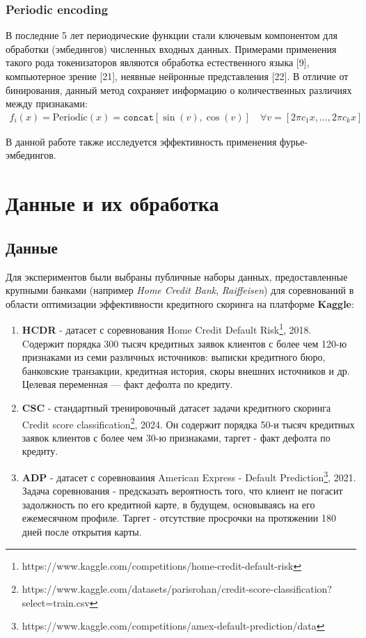 \documentclass[12pt]{article}
\begin{document}
\subsubsection{Periodic encoding}

В последние 5 лет периодические функции стали ключевым компонентом для обработки (эмбедингов) численных входных данных. Примерами применения такого рода токенизаторов являются обработка естественного языка [9], компьютерное зрение [21], неявные нейронные представления [22]. В отличие от бинирования, данный метод сохраняет информацию о количественных различиях между признаками:
\begin{align}
f_i(x) = \text{Periodic}(x) = \texttt{concat}[\sin(v), \cos(v)] \quad \forall v = [2\pi c_1 x, \ldots, 2\pi c_k x]
\end{align}

\noindent В данной работе также исследуется эффективность применения фурье-эмбедингов.

\newpage
\section{Данные и их обработка}
\subsection{Данные}

Для экспериментов были выбраны публичные наборы данных, предоставленные крупными банками (например \textit{Home Credit Bank}, \textit{Raiffeisen}) для соревнований в области оптимизации эффективности кредитного скоринга на платформе \textbf{Kaggle}:

\begin{enumerate}
    \item \textbf{HCDR} - датасет с соревнования {Home Credit Default Risk}\footnote{https://www.kaggle.com/competitions/home-credit-default-risk}, 2018. Cодержит порядка 300 тысяч кредитных заявок клиентов с более чем 120-ю признаками из семи различных источников: выписки кредитного бюро, банковские транзакции, кредитная история, скоры внешних источников и др. Целевая переменная — факт дефолта по кредиту.

    \item \textbf{CSC} - стандартный тренировочный датасет задачи кредитного скоринга {Credit score classification}\footnote{https://www.kaggle.com/datasets/parisrohan/credit-score-classification?select=train.csv}, 2024. Он содержит порядка 50-и тысяч кредитных заявок клиентов с более чем 30-ю признаками, таргет - факт дефолта по кредиту.

    \item \textbf{ADP} - датасет с соревнования {American Express - Default Prediction}\footnote{https://www.kaggle.com/competitions/amex-default-prediction/data}, 2021. Задача соревнования - предсказать вероятность того, что клиент не погасит задолжность по его кредитной карте, в будущем, основываясь на его ежемесячном профиле. Таргет - отсутствие просрочки на протяжении 180 дней после открытия карты.
    
    
\end{enumerate}
\end{document}
